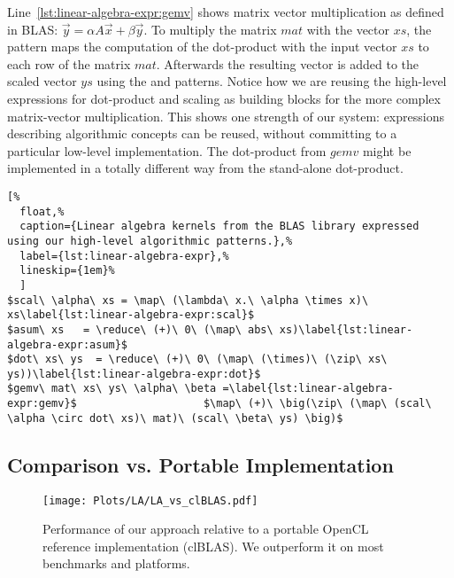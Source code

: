Line~\ref{lst:linear-algebra-expr:gemv} shows matrix vector multiplication as defined in BLAS: $\vec{y} = \alpha A \vec{x} + \beta \vec{y}$.
To multiply the matrix $mat$ with the vector $xs$, the \map pattern maps the computation of the dot-product with the input vector $xs$ to each row of the matrix $mat$.
Afterwards the resulting vector is added to the scaled vector $ys$ using the \zip and \map patterns.
Notice how we are reusing the high-level expressions for dot-product and scaling as building blocks for the more complex matrix-vector multiplication.
This shows one strength of our system: expressions describing algorithmic concepts can be reused, without committing to a particular low-level implementation.
The dot-product from $gemv$ might be implemented in a totally different way from the stand-alone dot-product.

\begin{lstlisting}[%
  float,%
  caption={Linear algebra kernels from the BLAS library expressed using our high-level algorithmic patterns.},%
  label={lst:linear-algebra-expr},%
  lineskip={1em}%
  ]
$scal\ \alpha\ xs = \map\ (\lambda\ x.\ \alpha \times x)\ xs\label{lst:linear-algebra-expr:scal}$
$asum\ xs   = \reduce\ (+)\ 0\ (\map\ abs\ xs)\label{lst:linear-algebra-expr:asum}$
$dot\ xs\ ys  = \reduce\ (+)\ 0\ (\map\ (\times)\ (\zip\ xs\ ys))\label{lst:linear-algebra-expr:dot}$
$gemv\ mat\ xs\ ys\ \alpha\ \beta =\label{lst:linear-algebra-expr:gemv}$                    $\map\ (+)\ \big(\zip\ (\map\ (scal\ \alpha \circ dot\ xs)\ mat)\ (scal\ \beta\ ys) \big)$
\end{lstlisting}




\subsection{Comparison vs. Portable Implementation}

\begin{figure}[t]
  \centering
  \texttt{[image: Plots/LA/LA\_vs\_clBLAS.pdf]}
  \caption{Performance of our approach relative to a portable OpenCL reference implementation (clBLAS).
           We outperform it on most benchmarks and platforms.}
  \label{fig:linear-algebra-expr:clblas}
\end{figure}

